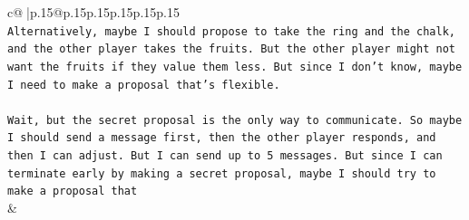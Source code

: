 \documentclass{article}
\begin{document}
{\begin{supertabular}{c@{$\;$}|p{.15\linewidth}@{}p{.15\linewidth}p{.15\linewidth}p{.15\linewidth}p{.15\linewidth}p{.15\linewidth}}
{{{\\ 
\texttt{Alternatively, maybe I should propose to take the ring and the chalk, and the other player takes the fruits. But the other player might not want the fruits if they value them less. But since I don't know, maybe I need to make a proposal that's flexible.} \\
\\ 
\texttt{Wait, but the secret proposal is the only way to communicate. So maybe I should send a message first, then the other player responds, and then I can adjust. But I can send up to 5 messages. But since I can terminate early by making a secret proposal, maybe I should try to make a proposal that} \\
            }
        }
    }
    & \\ \\


\end{supertabular}}
\end{document}
